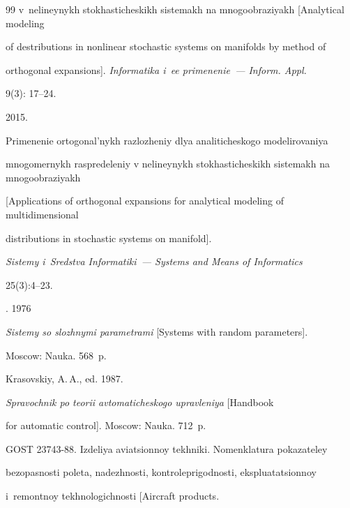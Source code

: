 {{\begin{thebibliography}{99}
 v~nelineynykh stokhasticheskikh sistemakh na mnogoobraziyakh [Analytical modeling 

 of destributions in nonlinear stochastic systems on manifolds by method of 

 orthogonal expansions]. \textit{Informatika i~ee primenenie~--- Inform. Appl.}  

 9(3): 17--24.




 2015.

Primenenie ortogonal'nykh razlozheniy dlya analiticheskogo mo\-de\-li\-ro\-va\-niya 

mnogomernykh raspredeleniy v nelineynykh stokhasticheskikh sistemakh na mnogoobraziyakh 

[Applications of orthogonal expansions for analytical modeling of multidimensional 

distributions in stochastic systems on manifold]. 

\textit{Sistemy i~Sredstva Informatiki~--- Systems and Means of Informatics}

 25(3):4--23.

 


. 1976

\textit{Sistemy so slozhnymi parametrami} [Systems with random parameters]. 

Moscow: Nauka. 568~p.




Krasovskiy, A.\,A., ed. 1987.

\textit{Spravochnik po teorii avtomaticheskogo upravleniya} [Handbook 

for automatic control].    Moscow: Nauka. 712~p.
















GOST 23743-88. Izdeliya aviatsionnoy tekhniki. Nomenklatura pokazateley 

bezopasnosti poleta, nadezhnosti, kontroleprigodnosti, ekspluatatsionnoy 

i~remontnoy tekhnologichnosti [Aircraft products. 


\end{thebibliography}}}
